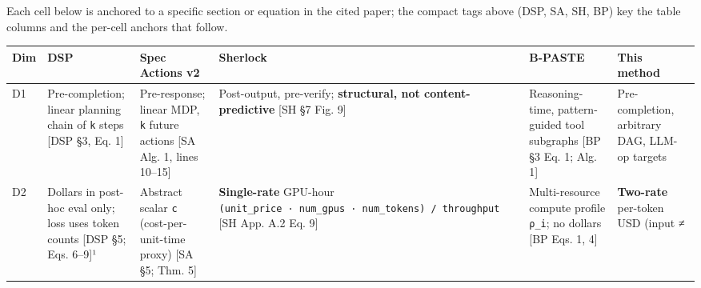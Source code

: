 \documentclass[
  11pt,
]{article}
\newcounter{none} %
\begin{document}
Each cell below is anchored to a specific section or equation in the
cited paper; the compact tags above (DSP, SA, SH, BP) key the table
columns and the per-cell anchors that follow.

{\def\LTcaptype{none} %
\begin{longtable}[]{@{}
  >{\raggedright\arraybackslash}p{}
  >{\raggedright\arraybackslash}p{}
  >{\raggedright\arraybackslash}p{}
  >{\raggedright\arraybackslash}p{}
  >{\raggedright\arraybackslash}p{}
  >{\raggedright\arraybackslash}p{}@{}}
\toprule\noalign{}
\begin{minipage}[b]{\linewidth}\raggedright
Dim
\end{minipage} & \begin{minipage}[b]{\linewidth}\raggedright
DSP
\end{minipage} & \begin{minipage}[b]{\linewidth}\raggedright
Spec Actions v2
\end{minipage} & \begin{minipage}[b]{\linewidth}\raggedright
Sherlock
\end{minipage} & \begin{minipage}[b]{\linewidth}\raggedright
B-PASTE
\end{minipage} & \begin{minipage}[b]{\linewidth}\raggedright
This method
\end{minipage} \\
\midrule\noalign{}
\endhead
\bottomrule\noalign{}
\endlastfoot
D1 & Pre-completion; linear planning chain of \texttt{k} steps {[}DSP
§3, Eq. 1{]} & Pre-response; linear MDP, \texttt{k} future actions {[}SA
Alg. 1, lines 10--15{]} & Post-output, pre-verify; \textbf{structural,
not content-predictive} {[}SH §7 Fig. 9{]} & Reasoning-time,
pattern-guided tool subgraphs {[}BP §3 Eq. 1; Alg. 1{]} &
Pre-completion, arbitrary DAG, LLM-op targets \\
D2 & Dollars in post-hoc eval only; loss uses token counts {[}DSP §5;
Eqs. 6--9{]}¹ & Abstract scalar \texttt{c} (cost-per-unit-time proxy)
{[}SA §5; Thm. 5{]} & \textbf{Single-rate} GPU-hour
\texttt{(unit\_price\ ·\ num\_gpus\ ·\ num\_tokens)\ /\ throughput}
{[}SH App. A.2 Eq. 9{]} & Multi-resource compute profile \texttt{ρ\_i};
no dollars {[}BP Eqs. 1, 4{]} & \textbf{Two-rate} per-token USD (input ≠

\end{longtable}}
\end{document}
